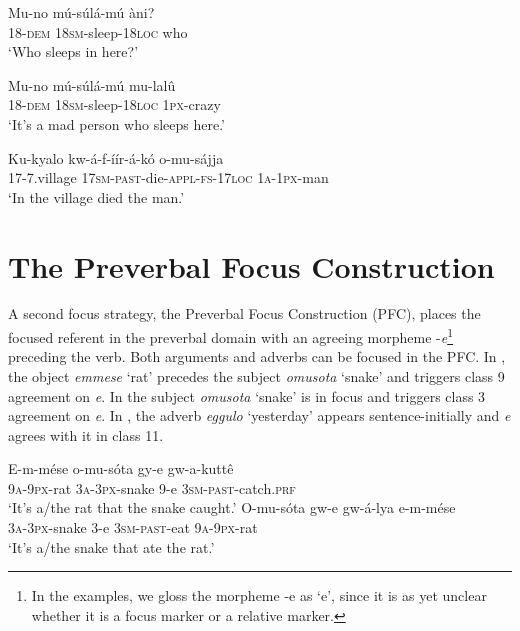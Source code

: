 \documentclass[output=paper]{langsci/langscibook}
\begin{document}
\ea\label{ex:vanderwal:8}
\ea\label{ex:vanderwal:8a}
\gll  Mu-no    mú-súlá-mú    àni?\\
       18-\textsc{dem}  \textsc{18sm}-sleep-\textsc{18loc}  who\\
\glt   ‘Who sleeps in here?’

\ex\label{ex:vanderwal:8b}
\gll  Mu-no    mú-súlá-mú    mu-lalû\\
       18-\textsc{dem}  1\textsc{8sm}-sleep-\textsc{18loc}  \textsc{1px}-crazy\\
\glt   ‘It’s a mad person who sleeps here.’
\z
\z

\ea\label{ex:vanderwal:9}
\gll Ku-kyalo  kw-á-f-íír-á-kó      o-mu-sájja\\
     17-7.village  \textsc{17sm}-\textsc{past}-die-\textsc{appl}-\textsc{fs}-\textsc{17loc}  \textsc{1a-1px}-man\\
\glt ‘In the village died the man.’
\z

\section{The Preverbal Focus Construction}\label{sec:vanderwal:3}
 

A second focus strategy, the Preverbal Focus Construction (PFC), places the focused referent in the preverbal domain with an agreeing morpheme -\textit{e}\footnote{In the examples, we gloss the morpheme -e as ‘e’, since it is as yet unclear whether it is a focus marker or a relative marker.}{} preceding the verb. Both arguments and adverbs can be focused in the PFC. In , the object \textit{emmese} ‘rat’ precedes the subject \textit{omusota} ‘snake’ and triggers class 9 agreement on \textit{e}. In  the subject \textit{omusota} ‘snake’ is in focus and triggers class 3 agreement on \textit{e}. In , the adverb \textit{eggulo} ‘yesterday’ appears sentence-initially and \textit{e} agrees with it in class 11.

\ea\label{ex:vanderwal:10}
\ea\label{ex:vanderwal:10a}
\gll    E-m-mése  o-mu-sóta    gy-e  gw-a-kuttê{\textup{} }\\
       \textsc{9a-9px}-rat  \textsc{3a}-\textsc{3px}-snake  9-e  \textsc{3sm}-\textsc{past}-catch.\textsc{prf}\\
\glt   ‘It’s a/the rat that the snake caught.’
\ex\label{ex:vanderwal:10b}
\gll    O-mu-sóta    gw-e  gw-á-lya    e-m-mése\\
       \textsc{3a-3px}-snake  3-e  \textsc{3sm-past}-eat  \textsc{9a-9px}-rat\\
\glt   ‘It’s a/the snake that ate the rat.’
\z
\z
\end{document}
